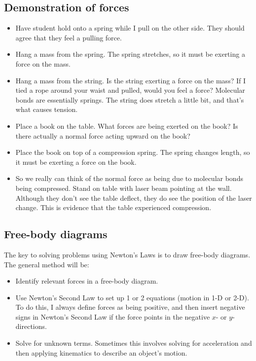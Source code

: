 \subsection{Demonstration of forces}
\begin{itemize}
\item Have student hold onto a spring while I pull on the other side. They should agree that they feel a pulling force.
\item Hang a mass from the spring. The spring stretches, so it must be exerting a force on the mass.
\item Hang a mass from the string. Is the string exerting a force on the mass? If I tied a rope around your waist and pulled, would you feel a force? Molecular bonds are essentially springs. The string does stretch a little bit, and that's what causes tension.
\item Place a book on the table. What forces are being exerted on the book? Is there actually a normal force acting upward on the book?
\item Place the book on top of a compression spring. The spring changes length, so it must be exerting a force on the book.
\item So we really can think of the normal force as being due to molecular bonds being compressed. Stand on table with laser beam pointing at the wall. Although they don't see the table deflect, they do see the position of the laser change. This is evidence that the table experienced compression.
\end{itemize}

\subsection{Free-body diagrams}
The key to solving problems using Newton's Laws is to draw free-body diagrams. The general method will be:
\begin{itemize}
\item Identify relevant forces in a free-body diagram.
\item Use Newton's Second Law to set up 1 or 2 equations (motion in 1-D or 2-D). To do this, I always define forces as being positive, and then insert negative signs in Newton's Second Law if the force points in the negative $x$- or $y$-directions.
\item Solve for unknown terms. Sometimes this involves solving for acceleration and then applying kinematics to describe an object's motion.
\end{itemize}


